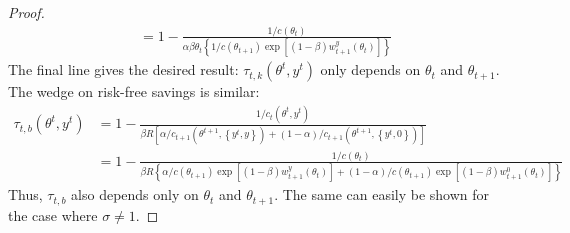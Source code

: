 \documentclass[11pt]{article}
\begin{document}
\begin{proof}
\begin{align*}
    &=1-\frac{1/c\left(\theta_{t}\right)}{\alpha\beta\theta_{t}\left\{ 1/c\left(\theta_{t+1}\right)\exp\left[\left(1-\beta\right)w_{t+1}^{y}\left(\theta_{t}\right)\right]\right\} }
\end{align*}
The final line gives the desired result: \( \tau_{t,k}\left(\theta^{t},y^{t}\right) \) only depends on \( \theta_t \) and \( \theta_{t+1} \). The wedge on risk-free savings is similar:
\begin{align*}
    \tau_{t,b}\left(\theta^{t},y^{t}\right)&=1-\frac{1/c_{t}\left(\theta^{t},y^{t}\right)}{\beta R\left[\alpha/c_{t+1}\left(\theta^{t+1},\left\{ y^{t},y\right\} \right)+\left(1-\alpha\right)/c_{t+1}\left(\theta^{t+1},\left\{ y^{t},0\right\} \right)\right]}\\
    &=1-\frac{1/c\left(\theta_{t}\right)}{\beta R\left\{ \alpha/c\left(\theta_{t+1}\right)\exp\left[\left(1-\beta\right)w_{t+1}^{y}\left(\theta_{t}\right)\right]+\left(1-\alpha\right)/c\left(\theta_{t+1}\right)\exp\left[\left(1-\beta\right)w_{t+1}^{0}\left(\theta_{t}\right)\right]\right\} }
\end{align*}
Thus, \( \tau_{t,b} \) also depends only on \( \theta_t \) and \( \theta_{t+1} \). The same can easily be shown for the case where \( \sigma \ne 1 \). 
\end{proof}
\end{document}
